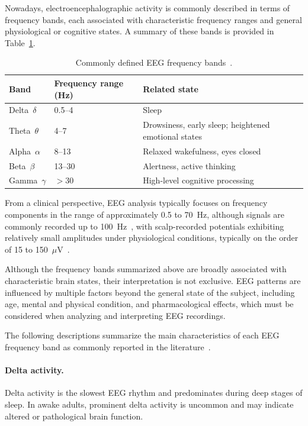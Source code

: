 Nowadays, electroencephalographic activity is commonly described in terms of frequency bands, each associated with characteristic frequency ranges and general physiological or cognitive states. A summary of these bands is provided in Table~\ref{tab:eeg_frequency_bands}.

\begin{table}[htbp]
\centering
\caption[Commonly defined EEG frequency bands.]{Commonly defined EEG frequency bands~\cite{nayak-2025}.}
\label{tab:eeg_frequency_bands}
\begin{tabular}{lll}
\hline
\textbf{Band} & \textbf{Frequency range (Hz)} & \textbf{Related state} \\
\hline
Delta~$\delta$  & 0.5--4   & Sleep \\
Theta~$\theta$  & 4--7     & Drowsiness, early sleep; heightened emotional states \\
Alpha~$\alpha$  & 8--13    & Relaxed wakefulness, eyes closed \\
Beta~$\beta$    & 13--30   & Alertness, active thinking \\
Gamma~$\gamma$  & $>$30    & High-level cognitive processing \\
\hline
\end{tabular}
\end{table}

From a clinical perspective, EEG analysis typically focuses on frequency components in the range of approximately 0.5 to 70~Hz, although signals are commonly
recorded up to 100~Hz~\cite{kong-2025}, with scalp-recorded potentials exhibiting relatively small amplitudes under physiological conditions, typically on the
order of 15 to 150~$\mu$V~\cite{Naydenov2022}.

Although the frequency bands summarized above are broadly associated with characteristic brain states, their interpretation is not exclusive. EEG patterns are
influenced by multiple factors beyond the general state of the subject, including age, mental and physical condition, and pharmacological effects, which must be
considered when analyzing and interpreting EEG recordings.

The following descriptions summarize the main characteristics of each EEG frequency band as commonly reported in the literature~\cite{nayak-2025}.

\paragraph*{Delta activity.}
Delta activity is the slowest EEG rhythm and predominates during deep stages of sleep. In awake adults, prominent delta activity is uncommon and may indicate altered or pathological brain function.

